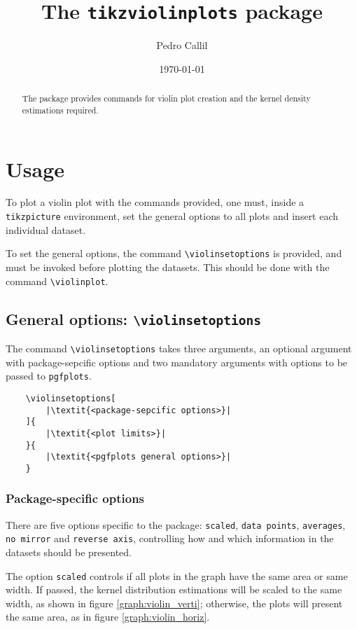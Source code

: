 \documentclass{article}
\title{The \texttt{tikzviolinplots} package}
\author{Pedro Callil}
\date{\today}
\begin{document}
\maketitle

\begin{abstract}
	The package provides commands for violin plot creation and
	the kernel density estimations required.
\end{abstract}

\section{Usage}

To plot a violin plot with the commands provided, one must, inside
a \texttt{tikzpicture} environment, set the general options to all
plots and insert each individual dataset.

To set the general options, the command \texttt{{\textbackslash}violinsetoptions}
is provided, and must be invoked before plotting the datasets. This should
be done with the command \texttt{{\textbackslash}violinplot}.

\subsection{General options: \texttt{{\textbackslash}violinsetoptions}}

The command \texttt{{\textbackslash}violinsetoptions} takes three arguments,
an optional argument with package-sepcific options and two mandatory
arguments with options to be passed to \texttt{pgfplots}.

\begin{verbatim}
	\violinsetoptions[
		|\textit{<package-sepcific options>}|
	]{
		|\textit{<plot limits>}|
	}{
		|\textit{<pgfplots general options>}|
	}
\end{verbatim}

\subsubsection{Package-specific options}

There are five options specific to the package: \texttt{scaled},
\texttt{data points}, \texttt{averages}, \texttt{no mirror} and
\texttt{reverse axis}, controlling how and which information
in the datasets should be presented.

The option \texttt{scaled} controls if all plots in the graph
have the same area or same width. If passed, the kernel
distribution estimations will be scaled to the same width, as
shown in figure \ref{graph:violin_verti}; otherwise, the plots
will present the same area, as in figure \ref{graph:violin_horiz}.
\end{document}
